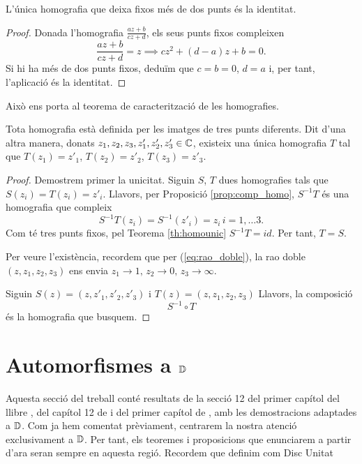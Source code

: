 \documentclass[dvipsnames, svgnames, leqno, a4paper, 12pt]{article}
\begin{document}
    \begin{theorem}\label{th:homounic}
        L'única homografia que deixa fixos més de dos punts és la identitat.
    \end{theorem}

    \begin{proof}
        Donada l'homografia $\frac{az+b}{cz+d}$, els seus punts fixos compleixen 
        \begin{displaymath}
            \frac{az+b}{cz+d}=z\implies cz^2+(d-a)z+b=0.
        \end{displaymath}
        Si hi ha més de dos punts fixos, deduïm que $c=b=0$, $d=a$ i, per tant, l'aplicació és la identitat.
    \end{proof}

    Això ens porta al teorema de caracterització de les homografies.

    \begin{theorem}
        Tota homografia està definida per les imatges de tres punts diferents.
        Dit d'una altra manera, donats $z_1,z_2,z_3,z'_1,z'_2,z'_3\in\mathbb{C}$, existeix una única homografia $T$ tal que $T(z_1)=z'_1$, $T(z_2)=z'_2$, $T(z_3)=z'_3$.
    \end{theorem}

    \begin{proof}
        Demostrem primer la unicitat. Siguin $S$, $T$ dues homografies tals que $S(z_i)=T(z_i)=z'_i$. Llavors, per Proposició \ref{prop:comp_homo}, $S^{-1}T$ és una homografia que compleix 
        \begin{displaymath}
            S^{-1}T(z_i)=S^{-1}(z'_i)=z_i\, i=1,\dots3.
        \end{displaymath}
        Com té tres punts fixos, pel Teorema \ref{th:homounic}  $S^{-1}T=id$. Per tant, $T=S$.

        Per veure l'existència, recordem que per (\ref{eq:rao_doble}), la rao doble $(z,z_1,z_2,z_3)$ ens envia $z_1\to1,\, z_2\to0,\, z_3\to\infty$. 

        Siguin $S(z)=(z,z'_1,z'_2,z'_3)$ i $T(z)=(z,z_1,z_2,z_3)$
        Llavors, la composició 
        \begin{displaymath}
            S^{-1}\circ T
        \end{displaymath}
        és la homografia que busquem.
    \end{proof}




\section[Automorfismes al Disc Unitat]{Automorfismes a $\mathbb{D}$}
    Aquesta secció del treball conté resultats de la secció 12 del primer capítol del llibre \cite{ford_1972}, del capítol 12 de \cite{rudin_1974} i del primer capítol de \cite{dineen_2016}, amb les demostracions adaptades a $\mathbb{D}$.
    Com ja hem comentat prèviament, centrarem la nostra atenció exclusivament a $\mathbb{D}$. Per tant, els teoremes i proposicions que enunciarem a partir d'ara seran sempre en aquesta regió. Recordem que definim com Disc Unitat
    
\end{document}
